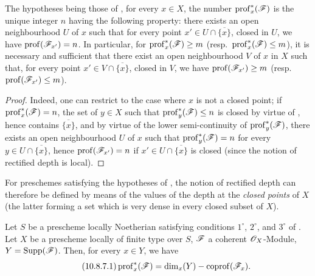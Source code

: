 \begin{corollary}[10.8.6]
\label{IV.10.8.6}
The hypotheses being those of , for every $x\in X$, the number $\operatorname{prof}^*_x(\mathscr{F})$ is the unique integer $n$ having the following property: there exists an open neighbourhood $U$ of $x$ such that for every point $x'\in U\cap\overline{\{x\}}$, closed in $U$, we have $\operatorname{prof}(\mathscr{F}_{x'})=n$.
In particular, for $\operatorname{prof}^*_x(\mathscr{F})\geq m$ (resp.\ $\operatorname{prof}^*_x(\mathscr{F})\leq m$), it is necessary and sufficient that there exist an open neighbourhood $V$ of $x$ in $X$ such that, for every point $x'\in V\cap\overline{\{x\}}$, closed in $V$, we have $\operatorname{prof}(\mathscr{F}_{x'})\geq m$ (resp.\ $\operatorname{prof}(\mathscr{F}_{x'})\leq m$).
\end{corollary}

\begin{proof}
Indeed, one can restrict to the case where $x$ is not a closed point; if $\operatorname{prof}^*_x(\mathscr{F})=n$, the set of $y\in X$ such that $\operatorname{prof}^*_y(\mathscr{F})\leq n$ is closed by virtue of , hence contains $\overline{\{x\}}$, and by virtue of the lower semi-continuity of $\operatorname{prof}^*_y(\mathscr{F})$, there exists an open neighbourhood $U$ of $x$ such that $\operatorname{prof}^*_y(\mathscr{F})=n$ for every $y\in U\cap\overline{\{x\}}$, hence $\operatorname{prof}(\mathscr{F}_{x'})=n$ if $x'\in U\cap\overline{\{x\}}$ is closed (since the notion of rectified depth is local).
\end{proof}

For preschemes satisfying the hypotheses of , the notion of rectified depth can therefore be defined by means of the values of the depth at the \emph{closed points} of $X$ (the latter forming a set which is very dense in every closed subset of $X$).

\begin{proposition}[10.8.7]
\label{IV.10.8.7}
Let $S$ be a prescheme locally Noetherian satisfying conditions $1^\circ$, $2^\circ$, and $3^\circ$ of .
Let $X$ be a prescheme locally of finite type over $S$, $\mathscr{F}$ a coherent $\mathscr{O}_X$-Module, $Y=\operatorname{Supp}(\mathscr{F})$.
Then, for every $x\in Y$, we have
\begin{equation}
\label{IV.10.8.7.1}
\tag{10.8.7.1}
\operatorname{prof}^*_x(\mathscr{F})=\dim_x(Y)-\operatorname{coprof}(\mathscr{F}_x).
\end{equation}
\end{proposition}

